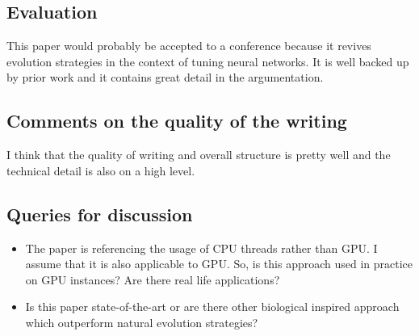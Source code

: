 \documentclass[a4paper]{article}
\begin{document}
\subsection{Evaluation}

This paper would probably be accepted to a conference because it revives evolution strategies in the context of tuning neural networks. It is well backed up by prior work and it contains great detail in the argumentation. 

\subsection{Comments on the quality of the writing}

I think that the quality of writing and overall structure is pretty well and the technical detail is also on a high level.

\subsection{Queries for discussion}

\begin{itemize}
	\item The paper is referencing the usage of CPU threads rather than GPU. I assume that it is also applicable to GPU. So, is this approach used in practice on GPU instances? Are there real life applications?
	\item Is this paper state-of-the-art or are there other biological inspired approach which outperform natural evolution strategies?
\end{itemize}
\end{document}
